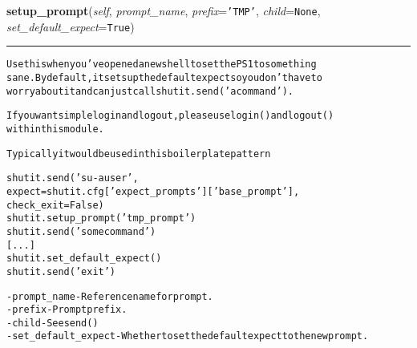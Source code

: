 \hspace{.8\funcindent}\begin{boxedminipage}{\funcwidth}

    \raggedright \textbf{setup\_prompt}(\textit{self}, \textit{prompt\_name}, \textit{prefix}={\tt \texttt{'}\texttt{TMP}\texttt{'}}, \textit{child}={\tt None}, \textit{set\_default\_expect}={\tt True})

    \vspace{-1.5ex}

    \rule{\textwidth}{0.5\fboxrule}
\setlength{\parskip}{2ex}
\begin{alltt}
Use this when you've opened a new shell to set the PS1 to something
sane. By default, it sets up the default expect so you don't have to
worry about it and can just call shutit.send('a command').

If you want simple login and logout, please use login() and logout()
within this module.

Typically it would be used in this boilerplate pattern

shutit.send('su - auser',
            expect=shutit.cfg['expect\_prompts']['base\_prompt'],
            check\_exit=False)
shutit.setup\_prompt('tmp\_prompt')
shutit.send('some command')
[...]
shutit.set\_default\_expect()
shutit.send('exit')

        - prompt\_name        - Reference name for prompt.
        - prefix             - Prompt prefix.
        - child              - See send()
        - set\_default\_expect - Whether to set the default expect to the new prompt.
\end{alltt}

\setlength{\parskip}{1ex}
    \end{boxedminipage}

    \label{shutit_global:ShutIt:revert_prompt}

    \vspace{0.5ex}

